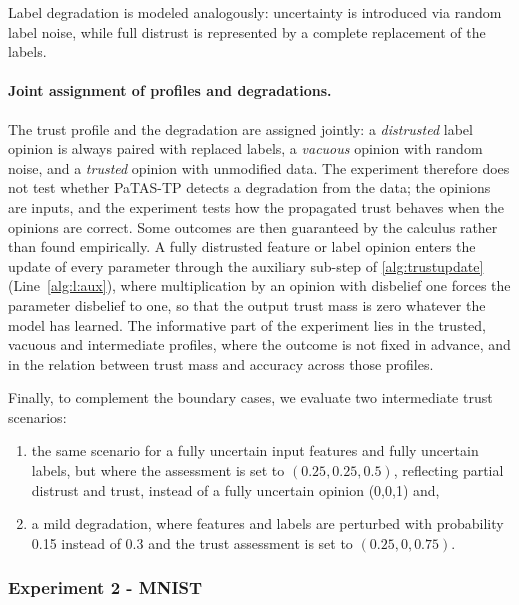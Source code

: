 \noindent Label degradation is modeled analogously: uncertainty is introduced via random label noise, while full distrust is represented by a complete replacement of the labels.

\paragraph*{Joint assignment of profiles and degradations.} The trust profile and the degradation are assigned jointly: a \emph{distrusted} label opinion is always paired with replaced labels, a \emph{vacuous} opinion with random noise, and a \emph{trusted} opinion with unmodified data. The experiment therefore does not test whether \ac{PaTAS-TP} detects a degradation from the data; the opinions are inputs, and the experiment tests how the propagated trust behaves when the opinions are correct. Some outcomes are then guaranteed by the calculus rather than found empirically. A fully distrusted feature or label opinion enters the update of every parameter through the auxiliary sub-step of \cref{alg:trustupdate} (Line~\ref{alg:l:aux}), where multiplication by an opinion with disbelief one forces the parameter disbelief to one, so that the output trust mass is zero whatever the model has learned. The informative part of the experiment lies in the trusted, vacuous and intermediate profiles, where the outcome is not fixed in advance, and in the relation between trust mass and accuracy across those profiles.

Finally, to complement the boundary cases, we evaluate two intermediate trust scenarios: 
\begin{enumerate}[\roman*.]
    \item the same scenario for a fully uncertain input features and fully uncertain labels, but where the assessment is set to \((0.25, 0.25, 0.5)\), reflecting partial distrust and trust, instead of a fully uncertain opinion (0,0,1) and,
    \item a mild degradation, where features and labels are perturbed with probability 0.15 instead of 0.3 and the trust assessment is set to \((0.25, 0, 0.75)\).
    
\end{enumerate}

\subsubsection{Experiment 2 - MNIST}\label{exp:2}

